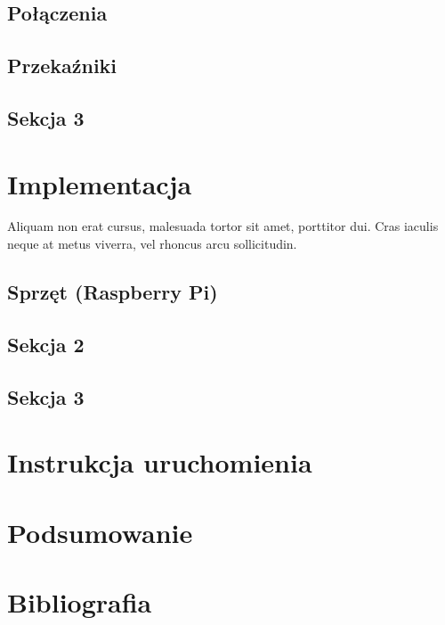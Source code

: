\documentclass[wmii,inf,mgr]{uwmthesis}
\begin{document}
\section{Połączenia}
\section{Przekaźniki}
\section{Sekcja 3}

\chapter{Implementacja}

Aliquam non erat cursus, malesuada tortor sit amet, porttitor dui. Cras iaculis neque at metus viverra, vel rhoncus arcu sollicitudin.
\section{Sprzęt (Raspberry Pi)}
\section{Sekcja 2}
\section{Sekcja 3}
\chapter{Instrukcja uruchomienia}
\chapter{Podsumowanie}
\chapter*{Bibliografia}
\end{document}
